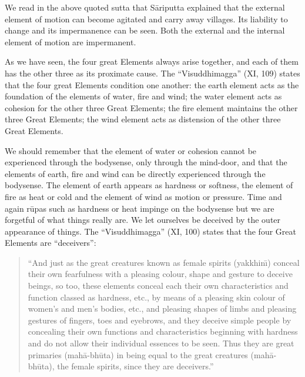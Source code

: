 \documentclass{book}
\begin{document}
We read in the above quoted sutta that S{\=a}riputta explained that the
external element of motion can become agitated and carry away villages.
Its liability to change and its impermanence can be seen. Both the
external and the internal element of motion are impermanent. 

As we have seen, the four great Elements always arise together, and each
of them has the other three as its proximate cause. The
``Visuddhimagga'' (XI, 109) states that the four great Elements
condition one another: the earth element acts as the foundation of the
elements of water, fire and wind; the water element acts as cohesion
for the other three Great Elements; the fire element maintains the
other three Great Elements; the wind element acts as distension of the
other three Great Elements.

We should remember that the element of water or cohesion cannot be
experienced through the bodysense, only through the mind-door, and
that the elements of earth, fire and wind can be directly experienced
through the bodysense. The element of earth appears as hardness or 
softness, the element of fire as heat or cold and the element of wind as
motion or pressure. Time and again r\=upas such as hardness or heat
impinge on the bodysense but we are forgetful of what things really
are. We let ourselves be deceived by the outer appearance of things.
The ``Visuddhimagga'' (XI, 100) states that the four Great Elements are
``deceivers'':




\begin{quote}\begin{flushleft}
``And just as the great creatures known as female spirits (yakkhin\=\i)
conceal their own fearfulness with a pleasing colour, shape and
gesture to deceive beings, so too, these elements conceal each their
own characteristics and function classed as hardness, etc., by means of
a pleasing skin colour of women's and men's bodies, etc., and pleasing
shapes of limbs and pleasing gestures of fingers, toes and eyebrows,
and they deceive simple people by concealing their own
functions and characteristics beginning with hardness and do not allow
their individual essences to be seen. Thus they are great primaries
(mah{\=a}-bh\=uta) in being equal to the great creatures
(mah{\=a}-bh\=uta), the female spirits, since they are deceivers.''

\end{flushleft}\end{quote}
\end{document}
